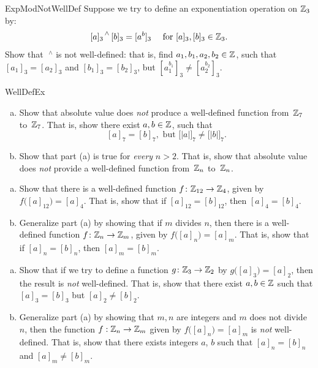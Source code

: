 \begin{exercise}{ExpModNotWellDef}
Suppose we try to define an exponentiation operation on $\mathbb{Z}_3$ by:
\[
 {[a]_3}^{\,\wedge} \, [b]_3 = [a^b]_3 \quad \text{ for } [a]_3, [b]_3 \in \mathbb{Z}_3. \]
Show that $\;^{\wedge}$ is not well-defined: that is, find $a_1, b_1, a_2, b_2 \in \mathbb{Z}$, such that $[a_1]_3 = [a_2]_3$ and $[b_1]_3 = [b_2]_3$, but $\left[a_1^{b_1} \right]_3 \neq \left[a_2^{b_2} \right]_3$.
\end{exercise}

\begin{exercise}{WellDefEx}
\begin{enumerate}[(a)]
\item  \label{WellDefEx-AbsVal0}
 Show that absolute value does \emph{not} produce a well-defined function from~$\mathbb{Z}_7$ to~$\mathbb{Z}_7$. That is, show there exist $a,b \in \mathbb{Z}$, such that 
\[ [a]_7 = [b]_7, \text{ but } \bigl[ |a| \bigr]_7 \neq \bigl[ |b| \bigr]_7.\]
\item  \label{WellDefEx-AbsVal}
 Show that part (a) is true for \emph{every} $n > 2$. That is, show that  absolute value does \emph{not} provide a well-defined function from~$\mathbb{Z}_n$ to~$\mathbb{Z}_n$. 
\end{enumerate}
\end{exercise}

\begin{exercise}{57}
\begin{enumerate}[(a)]
\item
Show that there is a well-defined function 
$f \colon \mathbb{Z}_{12} \to \mathbb{Z}_{4}$, given by \\
$ f \bigl( [a]_{12} \bigr) = [a]_{4}$. 
That is, show that if $[a]_{12} = [b]_{12}$, then $ [a]_4  = [b]_4$.
\item  \label{WellDefEx-divide}
Generalize part (a) by showing that if $m$ divides $n$, then there is a well-defined function 
$f \colon \mathbb{Z}_n \to \mathbb{Z}_m$, given by $f \bigl( [a]_n \bigr) = [a]_m$.
That is, show that if $[a]_n = [b]_n$, then $ [a]_m =  [b]_m$.
\end{enumerate}
\end{exercise}

\begin{exercise}{58}
\begin{enumerate}[(a)]
\item  \label{WellDefEx-odd2}
 Show that if we try to define a function $g \colon \mathbb{Z}_3 \to \mathbb{Z}_2$ by $g \bigl( [a]_3 \bigr) = [a]_2$, then the result is \emph{not} well-defined. That is, show that there exist $a, b \in \mathbb{Z}$ such that
$[a]_3 = [b]_3$  but $[a]_2 \neq [b]_2.$
\item
Generalize part (a) by showing that $m, n$ are integers and $m$ does not divide $n$, then the function 
$f: \mathbb{Z}_n \to \mathbb{Z}_m$  given by $f \bigl( [a]_n \bigr) = [a]_m$ is \emph{not} well-defined.
That is, show that there exists integers $a$, $b$ such that $[a]_n = [b]_n$ and $ [a]_m \neq   [b]_m$.
\end{enumerate}
\end{exercise}


